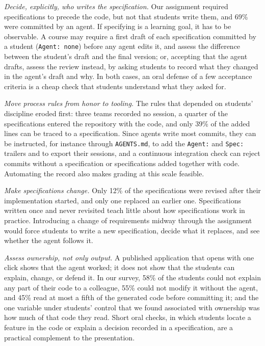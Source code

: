 \documentclass[conference]{IEEEtran}
\begin{document}
\emph{Decide, explicitly, who writes the specification.} Our assignment required specifications to precede the code, but not that students write them, and 69\% were committed by an agent. If specifying is a learning goal, it has to be observable. A course may require a first draft of each specification committed by a student (\texttt{Agent: none}) before any agent edits it, and assess the difference between the student's draft and the final version; or, accepting that the agent drafts, assess the review instead, by asking students to record what they changed in the agent's draft and why. In both cases, an oral defense of a few acceptance criteria is a cheap check that students understand what they asked for.

\emph{Move process rules from honor to tooling.} The rules that depended on students' discipline eroded first: three teams recorded no session, a quarter of the specifications entered the repository with the code, and only 39\% of the added lines can be traced to a specification. Since agents write most commits, they can be instructed, for instance through \texttt{AGENTS.md}, to add the \texttt{Agent:} and \texttt{Spec:} trailers and to export their sessions, and a continuous integration check can reject commits without a specification or specifications added together with code. Automating the record also makes grading at this scale feasible.

\emph{Make specifications change.} Only 12\% of the specifications were revised after their implementation started, and only one replaced an earlier one. Specifications written once and never revisited teach little about how specifications work in practice. Introducing a change of requirements midway through the assignment would force students to write a new specification, decide what it replaces, and see whether the agent follows it.

\emph{Assess ownership, not only output.} A published application that opens with one click shows that the agent worked; it does not show that the students can explain, change, or defend it. In our survey, 58\% of the students could not explain any part of their code to a colleague, 55\% could not modify it without the agent, and 45\% read at most a fifth of the generated code before committing it; and the one variable under students' control that we found associated with ownership was how much of that code they read. Short oral checks, in which students locate a feature in the code or explain a decision recorded in a specification, are a practical complement to the presentation.
\end{document}
